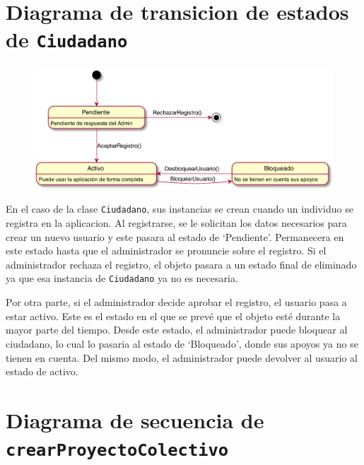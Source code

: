 \documentclass[12pt]{article}
\begin{document}
\newpage
\section{Diagrama de transicion de estados de \texttt{Ciudadano}}

\begin{figure}[h!]
    \centering
    \includegraphics[scale=0.45]{Images/ciudadano_state.pdf}
    \vspace{+10pt}
\end{figure}
En el caso de la clase \texttt{Ciudadano}, sus instancias se crean cuando un individuo se registra en la aplicacion. Al registrarse, se le solicitan los datos necesarios para crear un nuevo usuario y este pasara al estado de `Pendiente'. Permanecera en este estado hasta que el administrador se pronuncie sobre el registro. Si el administrador rechaza el registro, el objeto pasara a un estado final de eliminado ya que esa instancia de \texttt{Ciudadano} ya no es necesaria.
\par
 
Por otra parte, si el administrador decide aprobar el registro, el usuario pasa a estar activo. Este es el estado en el que se prevé que el objeto esté durante la mayor parte del tiempo. Desde este estado, el administrador puede bloquear al ciudadano, lo cual lo pasaria al estado de `Bloqueado', donde sus apoyos ya no se tienen en cuenta. Del mismo modo, el administrador puede devolver al usuario al estado de activo.



\newpage
\section{Diagrama de secuencia de \texttt{crearProyectoColectivo}}
\end{document}
